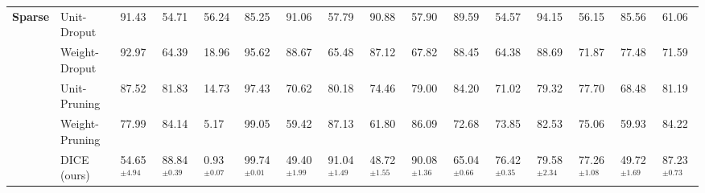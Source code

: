 \documentclass[runningheads]{llncs}
\begin{document}
\begin{sidewaystable}
{\begin{tabular}{llllllllllllllll}
 \multirow{5}{*}{\textbf{Sparse}} & Unit-Droput & 91.43 & 54.71 & 56.24 & 85.25 & 91.06 & 57.79 & 90.88 & 57.90 & 89.59 & 54.57 & 94.15 & 56.15 & 85.56 & 61.06 \\
 & Weight-Droput & 92.97 & 64.39 & 18.96 & 95.62 & 88.67 & 65.48 & 87.12 & 67.82 & 88.45 & 64.38 & 88.69 & 71.87 & 77.48 & 71.59 \\
 & Unit-Pruning & 87.52 & 81.83 & 14.73 & 97.43 & 70.62 & 80.18 & 74.46 & 79.00 & 84.20 & 71.02 & 79.32 & 77.70 & 68.48 & 81.19 \\
 & Weight-Pruning & 77.99 & 84.14 & 5.17 & 99.05 & 59.42 & 87.13 & 61.80 & 86.09 & 72.68 & 73.85 & 82.53 & 75.06 & 59.93 & 84.22 \\
 & {DICE} (ours) 
  & 54.65$^{\pm{4.94}}$ & 88.84$^{\pm{0.39}}$ & 0.93$^{\pm{0.07}}$ & 99.74$^{\pm{0.01}}$ & 49.40$^{\pm{1.99}}$ & 91.04$^{\pm{1.49}}$ & 48.72$^{\pm{1.55}}$ & 90.08$^{\pm{1.36}}$ & 65.04$^{\pm{0.66}}$ & 76.42$^{\pm{0.35}}$ & 79.58$^{\pm{2.34}}$ & 77.26$^{\pm{1.08}}$ & 49.72$^{\pm{1.69}}$ & 87.23$^{\pm{0.73}}$ 
\\ \bottomrule
\end{tabular}}

\label{tab:detail-results-cifar100}
\end{sidewaystable}


 
\end{document}
